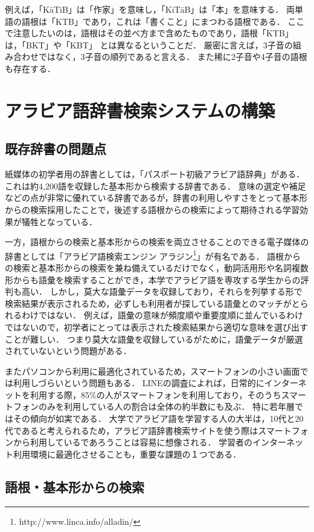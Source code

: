 \documentclass[technicalreport]{ieicej}
\begin{document}
例えば，「KāTiB」は「作家」を意味し，「KiTāB」は「本」を意味する．
両単語の語根は「KTB」であり，これは「書くこと」にまつわる語根である．
ここで注意したいのは，語根はその並べ方まで含めたものであり，語根「KTB」は，「BKT」や「KBT」 とは異なるということだ．
厳密に言えば，3子音の組み合わせではなく，3子音の順列であると言える．
また稀に2子音や4子音の語根も存在する．

\section{アラビア語辞書検索システムの構築}
\subsection{既存辞書の問題点}
紙媒体の初学者用の辞書としては，「パスポート初級アラビア語辞典」がある．
これは約4,200語を収録した基本形から検索する辞書である．
意味の選定や補足などの点が非常に優れている辞書であるが，辞書の利用しやすさをとって基本形からの検索採用したことで，後述する語根からの検索によって期待される学習効果が犠牲となっている．

一方，語根からの検索と基本形からの検索を両立させることのできる電子媒体の辞書としては「アラビア語検索エンジン アラジン\footnote{http://www.linca.info/alladin/}」が有名である．
語根からの検索と基本形からの検索を兼ね備えているだけでなく，動詞活用形や名詞複数形からも語彙を検索することができ，本学でアラビア語を専攻する学生からの評判も高い．
しかし，莫大な語彙データを収録しており，それらを列挙する形で検索結果が表示されるため，必ずしも利用者が探している語彙とのマッチがとられるわけではない．
例えば，語彙の意味が頻度順や重要度順に並んでいるわけではないので，初学者にとっては表示された検索結果から適切な意味を選び出すことが難しい．
つまり莫大な語彙を収録しているがために，語彙データが厳選されていないという問題がある．

またパソコンから利用に最適化されているため，スマートフォンの小さい画面では利用しづらいという問題もある．
LINEの調査によれば，日常的にインターネットを利用する際，85\%の人がスマートフォンを利用しており，そのうちスマートフォンのみを利用している人の割合は全体の約半数にも及ぶ．
特に若年層ではその傾向が如実である．
大学でアラビア語を学習する人の大半は，10代と20代であると考えられるため，アラビア語辞書検索サイトを使う際はスマートフォンから利用しているであろうことは容易に想像される．
学習者のインターネット利用環境に最適化させることも，重要な課題の１つである．

\subsection{語根・基本形からの検索}
\end{document}
